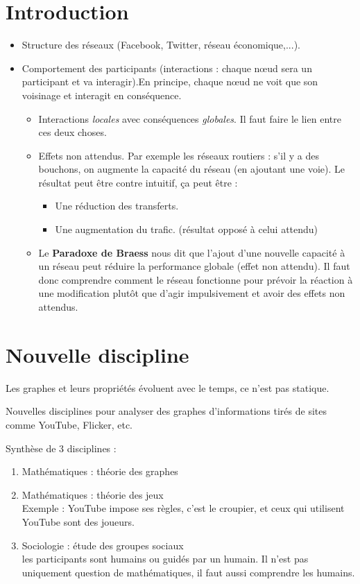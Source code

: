 \section{Introduction}
\begin{itemize}
\item Structure des réseaux (Facebook, Twitter, réseau économique,...).
\item Comportement des participants (interactions : chaque nœud sera un participant et va interagir).En principe, chaque nœud ne voit que son voisinage et interagit en conséquence.

\begin{itemize}
	\item Interactions \textit{locales} avec conséquences \textit{globales}.
	Il faut faire le lien entre ces deux choses.
	\item Effets non attendus. Par exemple les réseaux routiers : s'il y a des bouchons, on augmente la capacité du réseau (en ajoutant une voie). 
	Le résultat peut être contre intuitif, ça peut être :
	\begin{itemize} 
		\item Une réduction des transferts.
		\item Une augmentation du trafic. (résultat opposé à celui attendu)
	\end{itemize}	
	\item Le \textbf{Paradoxe de Braess} nous dit que l'ajout d'une nouvelle capacité à un réseau peut réduire la performance globale (effet non attendu).
Il faut donc comprendre comment le réseau fonctionne pour prévoir la réaction à une modification plutôt que d'agir impulsivement et avoir des effets non attendus.
\end{itemize}
\end{itemize}

\section{Nouvelle discipline}
Les graphes et leurs propriétés évoluent avec le temps, ce n'est pas statique.

Nouvelles disciplines pour analyser des graphes d'informations tirés de sites comme YouTube, Flicker, etc.

Synthèse de 3 disciplines :
\begin{enumerate}

	\item Mathématiques : théorie des graphes
	\item Mathématiques : théorie des jeux\\
		Exemple : YouTube impose ses règles, c'est le croupier, et ceux qui utilisent YouTube sont des joueurs.
	\item Sociologie : étude des groupes sociaux\\
		les participants sont humains ou guidés par un humain. Il n'est pas uniquement question de mathématiques, il faut aussi comprendre les humains.
\end{enumerate}

